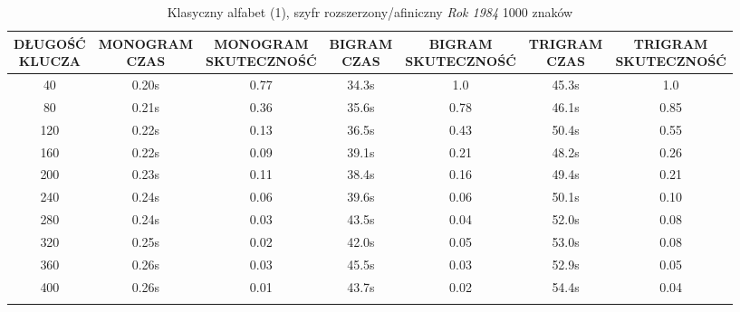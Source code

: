 \documentclass[a4paper]{article}
\theoremstyle{defn}
\theoremstyle{theorem}
\theoremstyle{lemma}
\theoremstyle{cor}
\theoremstyle{fact}
\begin{document}
\begin{center}\begin{small}\begin{longtable}{|c|c|c|c|c|c|c|}
\hline \makecell{DŁUGOŚĆ\\KLUCZA} &  \makecell{MONOGRAM\\CZAS} & \makecell{MONOGRAM\\SKUTECZNOŚĆ} & \makecell{BIGRAM\\CZAS} &  \makecell{BIGRAM\\SKUTECZNOŚĆ} & \makecell{TRIGRAM\\CZAS} & \makecell{TRIGRAM\\SKUTECZNOŚĆ}\\ \hline
40 & 0.20s & 0.77 & 34.3s & 1.0 & 45.3s & 1.0 \\ \hline
80 & 0.21s & 0.36 & 35.6s & 0.78 & 46.1s & 0.85 \\ \hline
120 & 0.22s & 0.13 & 36.5s & 0.43 & 50.4s & 0.55 \\ \hline
160 & 0.22s & 0.09 & 39.1s & 0.21 & 48.2s & 0.26 \\ \hline
200 & 0.23s & 0.11 & 38.4s & 0.16 & 49.4s & 0.21 \\ \hline
240 & 0.24s & 0.06 & 39.6s & 0.06 & 50.1s & 0.10 \\ \hline
280 & 0.24s & 0.03 & 43.5s & 0.04 & 52.0s & 0.08 \\ \hline
320 & 0.25s & 0.02 & 42.0s & 0.05 & 53.0s & 0.08 \\ \hline
360 & 0.26s & 0.03 & 45.5s & 0.03 & 52.9s & 0.05 \\ \hline
400 & 0.26s & 0.01 & 43.7s & 0.02 & 54.4s & 0.04 \\ \hline
\caption{Klasyczny alfabet (1), szyfr rozszerzony/afiniczny \textit{Rok 1984} 1000 znaków}
\end{longtable}\end{small}\end{center}
\end{document}
